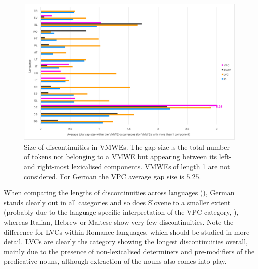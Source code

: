 \documentclass[output=paper,
modfonts,
]{langscibook}
\begin{document}

\begin{figure}
\centering
\includegraphics[width=1.0\textwidth]{figures/parseme-st-2017-BOOK-CORPUS-chart-discont.png}
\caption{Size of discontinuities in VMWEs. The gap size is the total number of tokens not belonging to a VMWE but appearing between its left- and  right-most lexicalised components.
VMWEs of length 1 are not considered. For German the VPC average gap size is $5.25$.}
\label{fig:gaps-per-category}
\end{figure}
When comparing the lengths of discontinuities across languages (), German stands clearly out %
in all categories %
and so does Slovene to a smaller extent (probably due to the language-specific interpretation of the VPC category, ), whereas Italian, Hebrew or Maltese show very few discontinuities. Note the difference for LVCs within Romance languages, which should be studied in more detail. %
LVCs are clearly the category showing the longest discontinuities overall, mainly due to the presence of non-lexicalised determiners and pre-modifiers of the predicative nouns, although extraction of the nouns also comes into play.
\end{document}
